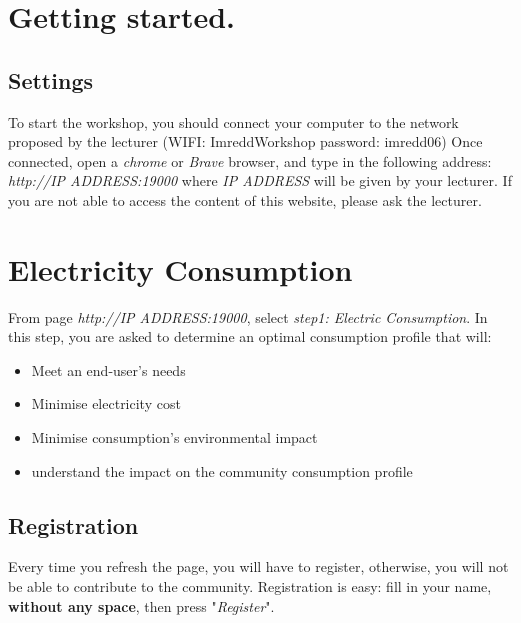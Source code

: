 \documentclass[a4paper, chapterprefix=true, openany]{scrbook}
\begin{document}
	\vfill
	

	
	
	
	\tableofcontents
	
	
	\chapter{Getting started.} 

	\section{Settings}
	To start the workshop, you should connect your computer to the network proposed by the lecturer (WIFI: ImreddWorkshop  password: imredd06) %
	Once connected, open a \textit{chrome} or \textit{Brave} browser, and type in the following address: \textit{http://IP ADDRESS:19000} where \textit{IP ADDRESS} will be given by your lecturer.
	If you are not able to access the content of this website, please ask the lecturer.
	
	\chapter{Electricity Consumption}

From page \textit{http://IP ADDRESS:19000}, select \textit{step1: Electric Consumption}.
In this step, you are asked to determine an optimal consumption profile that will:
\begin{itemize}
	\item Meet an end-user's needs
	\item Minimise electricity cost
	\item Minimise consumption's environmental impact
	\item understand the impact on the community consumption profile
\end{itemize}

\section{Registration}
Every time you refresh the page, you will have to register, otherwise, you will not be able to contribute to the community.
Registration is easy: fill in your name, \textbf{without any space}, then press "\textit{Register}".
\end{document}
